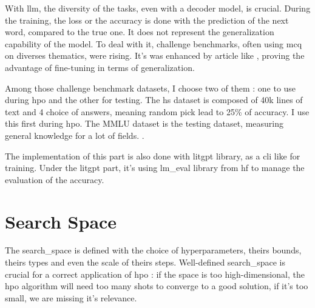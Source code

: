 With \acrshort{llm}, the diversity of the tasks, even with a \gls{decoder} model, is crucial. During the training, the loss or the accuracy is done with the prediction of the next word, compared to the true one. It does not represent the generalization capability of the model. To deal with it, challenge benchmarks, often using \acrfull{mcq} on diverses thematics, were rising. It's was enhanced by article like \cite{wei_finetuned_2022}, proving the advantage of fine-tuning in terms of generalization. 

Among those challenge benchmark datasets, I choose two of them : one to use during \acrshort{hpo} and the other for testing. The \Gls{hs} \cite{zellers_hellaswag_2019} dataset is composed of 40k lines of text and 4 choice of answers, meaning random pick lead to 25\% of accuracy. I use this first during \acrshort{hpo}. The MMLU dataset \cite{hendrycks_measuring_2021} is the testing dataset, measuring general knowledge for a lot of fields. .

The implementation of this part is also done with \gls{litgpt} library, as a \acrshort{cli} like for training. Under the \gls{litgpt} part, it's using lm\_eval library from \gls{hf} to manage the evaluation of the accuracy. 



\section{Search Space}
\label{sec:search_space}

The \gls{search_space}  is defined with the choice of \glspl{hyperparameter}, theirs bounds, theirs types and even the scale of theirs steps.  Well-defined \gls{search_space}  is crucial for a correct application of \acrshort{hpo} : if the space is too high-dimensional, the \acrshort{hpo} algorithm will need too many shots to converge to a good solution, if it's too small, we are missing it's relevance. 

